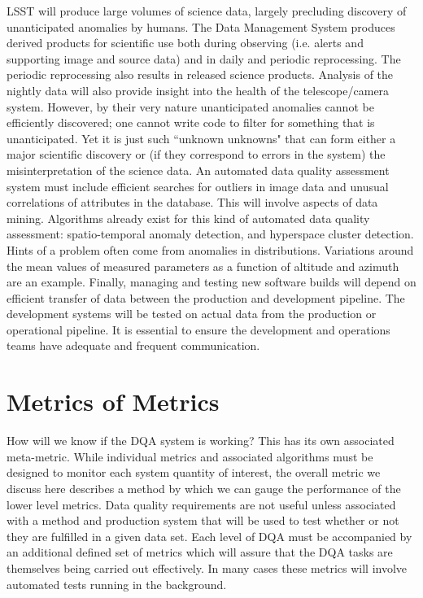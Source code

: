 \documentclass[SE,toc]{lsstdoc}
\begin{document}
LSST will produce large volumes of science data, largely precluding discovery of unanticipated anomalies by humans.  The Data Management System produces derived products for scientific use both during observing (i.e. alerts and supporting image and source data) and in daily and periodic reprocessing.  The periodic reprocessing also results in released science products. Analysis of the nightly data will also provide insight into the health of the telescope/camera system.  However, by their very nature unanticipated anomalies cannot be efficiently discovered; one cannot write code to filter for something that is unanticipated. Yet it is just such ``unknown unknowns" that can form either a major scientific discovery or (if they correspond to errors in the system) the misinterpretation of the science data.  An automated data quality assessment system must include efficient searches for outliers in image data and unusual correlations of attributes in the database. This will involve aspects of data mining.  Algorithms already exist for this kind of automated data quality assessment: spatio-temporal anomaly detection, and hyperspace cluster detection.
Hints of a problem often come from anomalies in distributions.  Variations around the mean values of measured parameters as a function of altitude and azimuth are an example.
Finally, managing and testing new software builds will depend on efficient transfer of data between the production and development pipeline. The development systems will be tested on actual data from the production or operational pipeline. It is essential to ensure the development and operations teams have adequate and frequent communication.

\section{Metrics of Metrics}

How will we know if the DQA system is working? This has its own associated meta-metric. While individual metrics and associated algorithms must be designed to monitor each system quantity of interest, the overall metric we discuss here describes a method by which we can gauge the performance of the lower level metrics.
Data quality requirements are not useful unless associated with a
method and production system that will be used to test whether or not they are fulfilled in
a given data set. Each level of DQA must be accompanied by an additional defined set of metrics which will assure that
the DQA tasks are themselves being carried out effectively. In many cases these metrics will involve
automated tests running in the background.
\end{document}
